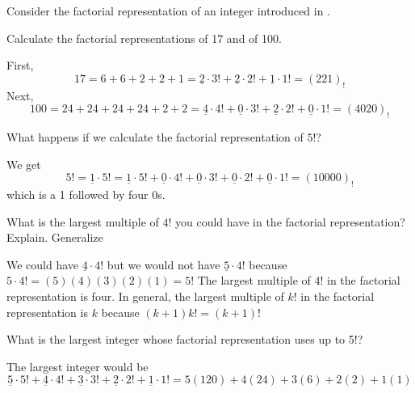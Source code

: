 \begin{exam}
\label{exam_fact_rep}
    Consider the factorial representation of an integer introduced in .
        \begin{apart}
            \item Calculate the factorial representations of 17 and of 100.
                \begin{soln}
                    First, 
                       $$17 =  6 + 6 + 2 + 2 +1 = \underline{2} \cdot 3! + \underline{2} \cdot 2! + \underline{1} \cdot 1! = (221)_!$$
                    Next,
                        $$100 = 24 + 24 + 24 + 24 + 2 + 2 = \underline{4} \cdot 4! + \underline{0} \cdot 3! + \underline{2} \cdot 2! + \underline{0} \cdot 1! = (4020)_!$$
                \end{soln}
            \item What happens if we calculate the factorial representation of $5!$?
                \begin{soln}
                    We get 
                        $$5! = \underline{1} \cdot 5!
                        = \underline{1} \cdot 5! + \underline{0} \cdot 4! + \underline{0} \cdot 3! + \underline{0} \cdot 2! + \underline{0} \cdot 1! 
                        =(10000)_!$$
                    which is a 1 followed by four 0s.
                \end{soln}
            \item What is the largest multiple of $4!$ you could have in the factorial representation? Explain.  Generalize
                \begin{soln}
                    We could have $\underline{4} \cdot 4!$ but we would not have $\underline{5} \cdot 4!$ because $5\cdot 4! = (5)(4)(3)(2)(1) = 5!$  The largest multiple of $4!$ in the factorial representation is four.  In general, the largest multiple of $k!$ in the factorial representation is $k$ because $(k+1)k!=(k+1)!$
                \end{soln}
            \item What is the largest integer whose factorial representation uses up to 5!?
                \begin{soln}
                    The largest integer would be
                        $$\underline{5} \cdot 5!
                        + \underline{4} \cdot 4!
                        + \underline{3} \cdot 3!
                        + \underline{2} \cdot 2!
                        + \underline{1} \cdot 1!
                        = 5(120)+4(24)+3(6)+2(2)+1(1)
$$
\end{soln}
\end{apart}
\end{exam}

